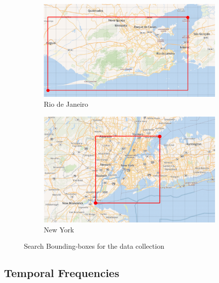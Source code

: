 \begin{figure}[h]
     \begin{subfigure}[t]{0.42\textwidth}
        \centering
        \includegraphics[width=1\linewidth]{figures/rio_bb.png}
        \caption{Rio de Janeiro}
        \label{fig:riodejaneiro_bounding_box}
    \end{subfigure}
    \quad
    \begin{subfigure}[t]{0.38\textwidth}
        \centering
        \includegraphics[width=1\linewidth]{figures/newyork_bb.png}
        \caption{New York}
        \label{fig:newyork_bounding_box}
    \end{subfigure}
    \caption{Search Bounding-boxes for the data collection}
    \label{fig:bounding_boxes}
\end{figure}

\subsection{Temporal Frequencies}

